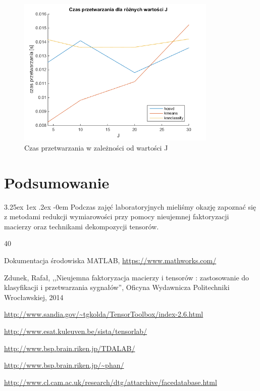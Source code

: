 \documentclass[11pt, a4paper]{article}
\makeatletter
\renewcommand\paragraph{\@startsection{paragraph}{5}{\z@}
  {3.25ex \@plus1ex \@minus.2ex}
  {-0em}
  {\normalfont\normalsize\bfseries}}
\makeatother
\begin{document}
\begin{figure}[H]
	\centering
	\includegraphics[width=0.85\textwidth]{./assets/wykres_zad3_czas.png}
	\caption{Czas przetwarzania w zależności od wartości J}
	\label{fig:wykres_zad3_czas}
\end{figure}


\section{Podsumowanie}
\paragraph{}
Podczas zajęć laboratoryjnych mieliśmy okazję zapoznać się z metodami redukcji wymiarowości przy pomocy nieujemnej faktoryzacji macierzy oraz technikami dekompozycji tensorów.



\newpage
\begin{thebibliography}{40}

Dokumentacja środowiska MATLAB,
\url{https://www.mathworks.com/}

Zdunek, Rafał, ,,Nieujemna faktoryzacja macierzy i tensorów : zastosowanie do klasyfikacji i przetwarzania sygnałów'', Oficyna Wydawnicza Politechniki Wrocławskiej, 2014

\url{http://www.sandia.gov/~tgkolda/TensorToolbox/index-2.6.html}

\url{http://www.esat.kuleuven.be/sista/tensorlab/}

\url{http://www.bsp.brain.riken.jp/TDALAB/}

\url{http://www.bsp.brain.riken.jp/~phan/}

\url{http://www.cl.cam.ac.uk/research/dtg/attarchive/facedatabase.html}

\end{thebibliography}
\end{document}
